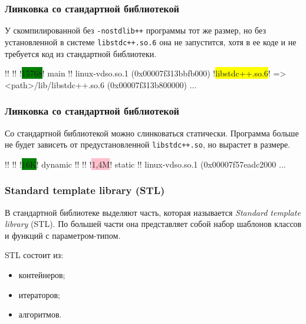 \documentclass[compress, 8pt]{beamer}
\begin{document}
  \begin{frame}[fragile]

    \frametitle{Линковка со стандартной библиотекой}

    У скомпилированной без \verb|-nostdlib++| программы тот же размер,
    но без установленной в системе \verb|libstdc++.so.6| она не запустится,
    хотя в ее коде и не требуется код из стандартной библиотеки.

    \begin{terminalwindow}
!!
!!
!\colorbox{green}{15768}!   main
!!
linux-vdso.so.1 (0x00007f313bbfb000)
!\colorbox{yellow}{libstdc++.so.6}! => <path>/lib/libstdc++.so.6 (0x00007f313b800000)
...
    \end{terminalwindow}

  \end{frame}

  \begin{frame}[fragile]

    \frametitle{Линковка со стандартной библиотекой}

    Со стандартной библиотекой можно слинковаться статически.
    Программа больше не будет зависеть от предустановленной \verb|libstdc++.so|,
    но вырастет в размере.

    \begin{terminalwindow}
!!
!!
!\colorbox{green}{16K}!     dynamic
!!
!!
!\colorbox{pink}{1,4M}!    static
!!
linux-vdso.so.1 (0x00007f57eadc2000
...
    \end{terminalwindow}

  \end{frame}

  \begin{frame}[fragile]

    \frametitle{Standard template library (STL)}

    В стандартной библиотеке выделяют часть, которая называется
    \textit{Standard template library}\footnotemark{} (STL).
    По большей части она представляет собой набор шаблонов классов и функций
    с параметром-типом.


    \hfill \break
    STL состоит из:

    \begin{itemize}
      \item контейнеров;
      \item итераторов;
      \item алгоритмов.
    \end{itemize}

  \end{frame}
\end{document}
